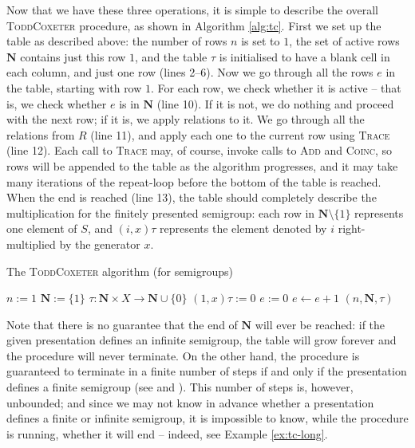 Now that we have these three operations, it is simple to describe the overall
\textsc{ToddCoxeter} procedure, as shown in Algorithm \ref{alg:tc}.  First we
set up the table as described above: the number of rows $n$ is set to $1$, the
set of active rows $\mathbf{N}$ contains just this row $1$, and the table $\tau$
is initialised to have a blank cell in each column, and just one row (lines
2--6).  Now we go through all the rows $e$ in the table, starting with row $1$.
For each row, we check whether it is active -- that is, we check whether $e$ is
in $\mathbf{N}$ (line 10).  If it is not, we do nothing and proceed with the
next row; if it is, we apply relations to it.  We go through all the relations
from $R$ (line 11), and apply each one to the current row using \textsc{Trace}
(line 12).  Each call to \textsc{Trace} may, of course, invoke calls to
\textsc{Add} and \textsc{Coinc}, so rows will be appended to the table as the
algorithm progresses, and it may take many iterations of the repeat-loop before
the bottom of the table is reached.  When the end is reached (line 13), the
table should
completely describe the multiplication for the finitely presented semigroup:
each row in $\mathbf{N} \setminus \{1\}$ represents one element of $S$, and
$(i, x)\tau$ represents the element denoted by $i$ right-multiplied by the
generator $x$.

\begin{algorithm}
\caption{The \textsc{ToddCoxeter} algorithm (for semigroups)}
\label{alg:tc}
\begin{algorithmic}[1]
\State $n := 1$
\State $\mathbf{N} := \{1\}$
\State $\tau : \mathbf{N} \times X \to \mathbf{N} \cup \{0\}$
  \State $(1, x)\tau := 0$
\EndFor
\State $e := 0$
\Repeat
  \State $e \gets e + 1$
      \State {}
    \EndFor
  \EndIf
{}  
\State \Return $(n, \mathbf{N}, \tau)$
\EndProcedure
\end{algorithmic}
\end{algorithm}

Note that there is no guarantee that the end of $\mathbf{N}$ will ever be
reached: if the given presentation defines an infinite semigroup, the table will
grow forever and the procedure will never terminate.  On the other hand, the
procedure is guaranteed to terminate in a finite number of steps if and only if
the presentation defines a finite semigroup (see \cite[Theorem 5.5]{cgt} and
\cite[Theorem 3]{beetham_campbell_1976}).  This number of steps is, however,
unbounded; and since we may not know in advance whether a presentation defines a
finite or infinite semigroup, it is impossible to know, while the procedure is
running, whether it will end -- indeed, see Example \ref{ex:tc-long}.

